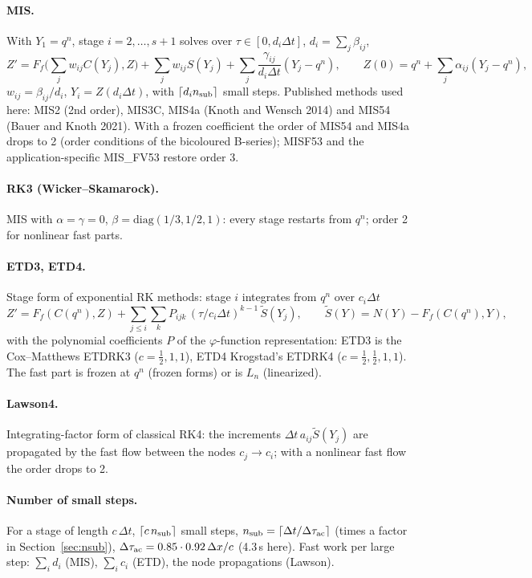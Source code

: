 \documentclass[11pt,a4paper]{article}
\newcommand{\dt}{\Delta t}
\begin{document}
\paragraph{MIS.} With $Y_1=q^n$, stage $i=2,\dots,s+1$ solves over $\tau\in[0,d_i\dt]$, $d_i=\sum_j\beta_{ij}$,
\[
Z'=F_f\Big(\sum_j w_{ij}C(Y_j),Z\Big)+\sum_jw_{ij}S(Y_j)+\sum_j\frac{\gamma_{ij}}{d_i\dt}(Y_j-q^n),\qquad
Z(0)=q^n+\sum_j\alpha_{ij}(Y_j-q^n),
\]
$w_{ij}=\beta_{ij}/d_i$, $Y_i=Z(d_i\dt)$, with $\lceil d_in_{\rm sub}\rceil$ small steps. Published methods
used here: MIS2 (2nd order), MIS3C, MIS4a (Knoth and Wensch 2014) and MIS54 (Bauer and Knoth 2021).
With a frozen coefficient the order of MIS54 and MIS4a drops to 2 (order conditions of the bicoloured
B-series); MISF53 and the application-specific MIS\_FV53 restore order 3.
\paragraph{RK3 (Wicker--Skamarock).} MIS with $\alpha=\gamma=0$, $\beta=\mathrm{diag}(1/3,1/2,1)$: every
stage restarts from $q^n$; order 2 for nonlinear fast parts.
\paragraph{ETD3, ETD4.} Stage form of exponential RK methods: stage $i$ integrates from $q^n$ over
$c_i\dt$
\[
Z'=F_f(C(q^n),Z)+\sum_{j\le i}\sum_kP_{ijk}\,(\tau/c_i\dt)^{k-1}\,\tilde S(Y_j),\qquad
\tilde S(Y)=N(Y)-F_f(C(q^n),Y),
\]
with the polynomial coefficients $P$ of the $\varphi$-function representation: ETD3 is the
Cox--Matthews ETDRK3 ($c=\tfrac12,1,1$), ETD4 Krogstad's ETDRK4 ($c=\tfrac12,\tfrac12,1,1$). The fast
part is frozen at $q^n$ (frozen forms) or is $L_n$ (linearized).
\paragraph{Lawson4.} Integrating-factor form of classical RK4: the increments $\dt\,a_{ij}\tilde S(Y_j)$ are
propagated by the fast flow between the nodes $c_j\to c_i$; with a nonlinear fast flow the order drops
to 2.
\paragraph{Number of small steps.} For a stage of length $c\,\dt$, $\lceil c\,n_{\rm sub}\rceil$ small
steps, $n_{\rm sub}=\lceil\dt/\Delta\tau_{\rm ac}\rceil$ (times a factor in Section~\ref{sec:nsub}),
$\Delta\tau_{\rm ac}=0.85\cdot0.92\,\Delta x/c$ (4.3\,s here). Fast work per large step: $\sum_id_i$
(MIS), $\sum_ic_i$ (ETD), the node propagations (Lawson).
\end{document}
